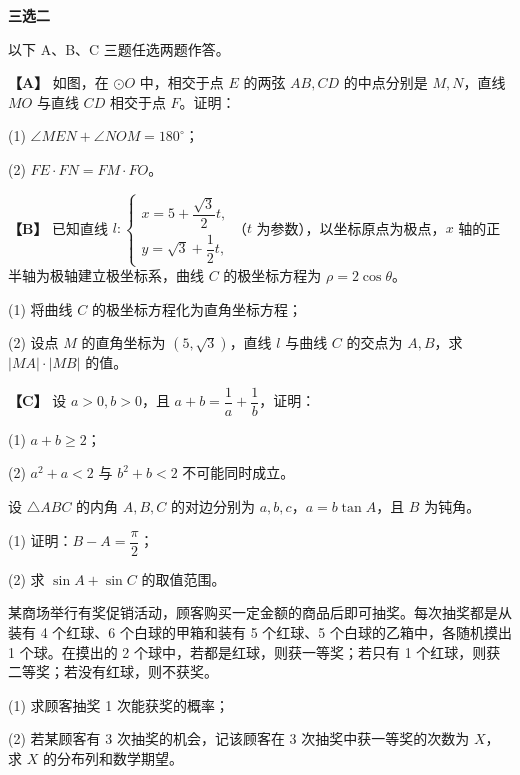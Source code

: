 \Needspace{0.4\textheight}
\begin{question}
\textbf{三选二} 

以下 A、B、C 三题任选两题作答。

\textbf{【A】} 如图，在 \(\odot O\) 中，相交于点 \(E\) 的两弦 \(AB,CD\) 的中点分别是 \(M,N\)，直线 \(MO\) 与直线 \(CD\) 相交于点 \(F\)。证明：
\nopagebreak[4]
\begin{center}\end{center}
\nopagebreak[4]
(1) \(\angle MEN+\angle NOM=180^\circ\)；

(2) \(FE\cdot FN=FM\cdot FO\)。

\textbf{【B】} 已知直线 \(l:\begin{cases}x=5+\dfrac{\sqrt3}{2}t,\\y=\sqrt3+\dfrac12t,\end{cases}\)（\(t\) 为参数），以坐标原点为极点，\(x\) 轴的正半轴为极轴建立极坐标系，曲线 \(C\) 的极坐标方程为 \(\rho=2\cos\theta\)。

(1) 将曲线 \(C\) 的极坐标方程化为直角坐标方程；

(2) 设点 \(M\) 的直角坐标为 \((5,\sqrt3)\)，直线 \(l\) 与曲线 \(C\) 的交点为 \(A,B\)，求 \(\lvert MA\rvert\cdot\lvert MB\rvert\) 的值。

\textbf{【C】} 设 \(a>0,b>0\)，且 \(a+b=\dfrac1a+\dfrac1b\)，证明：

(1) \(a+b\geqslant2\)；

(2) \(a^2+a<2\) 与 \(b^2+b<2\) 不可能同时成立。

\end{question}
\begin{question}

设 \(\triangle ABC\) 的内角 \(A,B,C\) 的对边分别为 \(a,b,c\)，\(a=b\tan A\)，且 \(B\) 为钝角。

(1) 证明：\(B-A=\dfrac{\pi}{2}\)；

(2) 求 \(\sin A+\sin C\) 的取值范围。

\end{question}
\begin{question}

某商场举行有奖促销活动，顾客购买一定金额的商品后即可抽奖。每次抽奖都是从装有 4 个红球、6 个白球的甲箱和装有 5 个红球、5 个白球的乙箱中，各随机摸出 1 个球。在摸出的 2 个球中，若都是红球，则获一等奖；若只有 1 个红球，则获二等奖；若没有红球，则不获奖。

(1) 求顾客抽奖 1 次能获奖的概率；

(2) 若某顾客有 3 次抽奖的机会，记该顾客在 3 次抽奖中获一等奖的次数为 \(X\)，求 \(X\) 的分布列和数学期望。

\Needspace{0.4\textheight}
\end{question}
